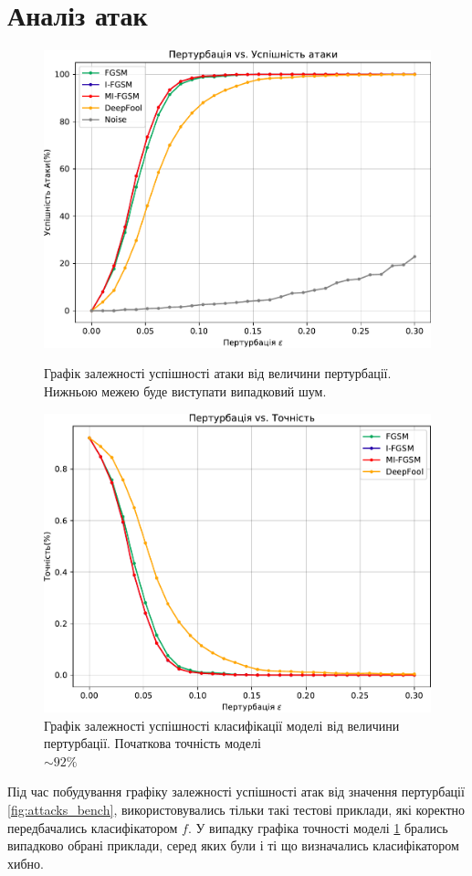 \documentclass[a4paper,14pt]{extreport}
\begin{document}
	\section{Аналіз атак}
	
	\begin{figure}[!htb]
		\includegraphics[width=1\textwidth]{resources/attacks_bench_8_6.pdf}
		\caption{Графік залежності успішності атаки від величини пертурбації. Нижньою межею буде виступати випадковий шум. }
		\label{fig:attacks_bench}
		\endminipage\hfill
		\includegraphics[width=1\textwidth]{resources/defenses_bench_8_6.pdf}
		\caption{Графік залежності успішності класифікації моделі від величини пертурбації. Початкова точність моделі \\ $\sim 92\%$}
		\label{fig:defenses_bench}
		\endminipage
	\end{figure}
	Під час побудування графіку залежності успішності атак від значення пертурбації \ref{fig:attacks_bench}, використовувались тільки такі тестові приклади, які коректно передбачались класифікатором $f$. У випадку графіка точності моделі \ref{fig:defenses_bench} брались випадково обрані приклади, серед яких були і ті що визначались класифікатором хибно.
	
\end{document}
